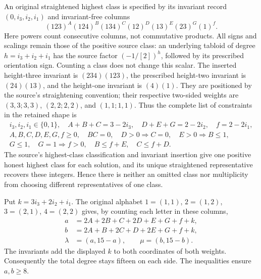 An original straightened highest class is specified by its invariant
record $(0,i_3,i_2,i_1)$ and invariant-free columns
\[
 (123)^A(124)^B(134)^C(12)^D(13)^E(23)^G(1)^f.
\]
Here powers count consecutive columns, not commutative products.
All signs and scalings remain those of the positive source class:
an underlying tabloid of degree $h=i_3+i_2+i_1$ has the source
factor $(-1/[2])^h$, followed by its prescribed orientation sign.
Counting a class does not change this scalar.
The inserted height-three invariant is $(234)(123)$,
the prescribed height-two invariant is $(24)(13)$, and the
height-one invariant is $(4)(1)$. They are positioned by the
source's straightening convention; their respective two-sided
weights are $(3,3;3,3)$, $(2,2;2,2)$, and $(1,1;1,1)$.
Thus the complete list of constraints in the retained shape is
\begin{gather}
 i_3,i_2,i_1\in\{0,1\},\quad
 A+B+C=3-2i_3,\quad D+E+G=2-2i_2,\quad f=2-2i_1,
 \label{eq:gct-honest-shape}\\
 A,B,C,D,E,G,f\geq0,\quad BC=0,\quad
 D>0\Longrightarrow C=0,\quad E>0\Longrightarrow B\leq1,
 \nonumber\\
 G\leq1,\quad G=1\Longrightarrow f>0,\quad
 B\leq f+E,\quad C\leq f+D.\label{eq:gct-honest-inequalities}
\end{gather}
The source's highest-class classification and invariant insertion
give one positive honest highest class for each solution, and its
unique straightened representative recovers these integers. Hence
there is neither an omitted class nor multiplicity from choosing
different representatives of one class.

Put $k=3i_3+2i_2+i_1$. The original alphabet
$1=(1,1)$, $2=(1,2)$, $3=(2,1)$, $4=(2,2)$ gives, by counting
each letter in these columns,
\begin{align}
 a&=2A+2B+C+2D+E+G+f+k,\nonumber\\
 b&=2A+B+2C+D+2E+G+f+k,\label{eq:gct-highest-letter-weights}\\
 \lambda&=(a,15-a),\qquad \mu=(b,15-b).\nonumber
\end{align}
The invariants add the displayed $k$ to both coordinates of both
weights. Consequently the total degree stays fifteen on each side.
The inequalities ensure $a,b\geq8$.

